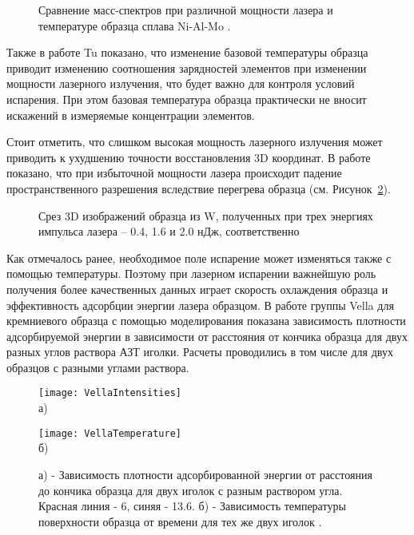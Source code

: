 \begin{figure}[htb]
	\caption{Сравнение масс-спектров при различной мощности лазера и температуре образца сплава Ni-Al-Mo \cite{Tu15}.}
	\label{fig:ParamsPower}
\end{figure}

Также в работе Tu \cite{Tu15} показано, что изменение базовой температуры образца приводит изменению соотношения зарядностей элементов при изменении мощности лазерного излучения, что будет важно для контроля условий испарения. При этом базовая температура образца практически не вносит искажений в измеряемые концентрации элементов.

Стоит отметить, что слишком высокая мощность лазерного излучения может приводить к ухудшению точности восстановления 3D координат. В работе \cite{Cerezo07} показано, что при избыточной мощности лазера происходит падение пространственного разрешения вследствие перегрева образца (см. Рисунок~\cref{fig:ParamsEnergy}).

\begin{figure}[htb]
	\caption{Срез 3D изображений образца из W, полученных при трех энергиях импульса лазера – 0.4, 1.6 и 2.0 нДж, соответственно~\cite{Cerezo07}}
	\label{fig:ParamsEnergy}
\end{figure}

Как отмечалось ранее, необходимое поле испарение может изменяться также с помощью температуры. Поэтому при лазерном испарении важнейшую роль получения более качественных данных играет скорость охлаждения образца и эффективность адсорбции энергии лазера образцом. В работе группы Vella \cite{Vella18} для кремниевого образца с помощью моделирования показана зависимость плотности адсорбируемой энергии в зависимости от расстояния от кончика образца для двух разных углов раствора АЗТ иголки. Расчеты проводились в том числе для двух образцов с разными углами раствора.

\begin{figure}[htb]
	\begin{minipage}[b]{0.49\textwidth}\centering
		\texttt{[image: VellaIntensities]} \\ а)
	\end{minipage}
	\begin{minipage}[b]{0.49\textwidth}\centering
		\texttt{[image: VellaTemperature]} \\ б)
	\end{minipage}
	\caption{а) - Зависимость плотности адсорбированной энергии от расстояния до кончика образца для двух иголок с разным раствором угла. Красная линия - 6\textdegree, синяя - 13.6\textdegree. б) - Зависимость температуры поверхности образца от времени для тех же двух иголок \cite{Vella18}.}
	\label{fig:VellaIntensities}
\end{figure}


